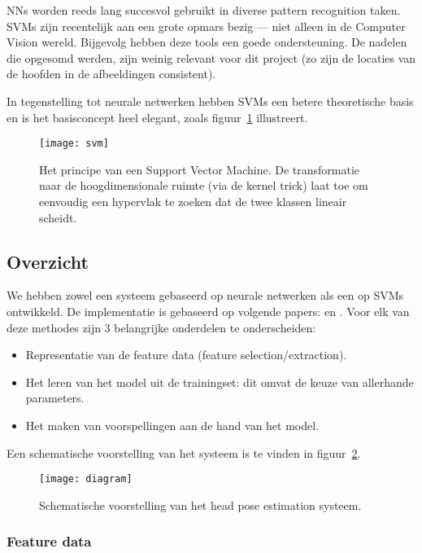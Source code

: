 \documentclass[a4paper,dutch,11pt,]{scrartcl}
\begin{document}
NNs worden reeds lang succesvol gebruikt in diverse pattern recognition taken. SVMs zijn recentelijk aan een grote opmars bezig --- niet alleen in de Computer Vision wereld. Bijgevolg hebben deze tools een goede ondersteuning. De nadelen die opgesomd werden, zijn weinig relevant voor dit project (zo zijn de locaties van de hoofden in de afbeeldingen consistent).

In tegenstelling tot neurale netwerken hebben SVMs een betere theoretische basis \cite{theoretical} en is het basisconcept heel elegant, zoals figuur~\ref{fig:svm} illustreert.

\begin{figure}[hbpt]\centering
 \texttt{[image: svm]}
\caption{Het principe van een Support Vector Machine. De transformatie naar de hoogdimensionale ruimte (via de kernel trick) laat toe om eenvoudig een hypervlak te zoeken dat de twee klassen lineair scheidt. \cite{svmwikipedia}}
\label{fig:svm}
\end{figure}

\subsection{Overzicht}
We hebben zowel een systeem gebaseerd op neurale netwerken als een op SVMs ontwikkeld. De implementatie is gebaseerd op volgende papers: \cite{neural} en \cite{svmli}.
Voor elk van deze methodes zijn 3 belangrijke onderdelen te onderscheiden: 
\begin{itemize}
 \item Representatie van de feature data (feature selection/extraction).
 \item Het leren van het model uit de trainingset: dit omvat de keuze van allerhande parameters.
 \item Het maken van voorspellingen aan de hand van het model.
\end{itemize}
Een schematische voorstelling van het systeem is te vinden in figuur~\ref{fig:diagram}.

\begin{figure}[hbpt]
\texttt{[image: diagram]}
\caption{Schematische voorstelling van het head pose estimation systeem.}
\label{fig:diagram}
\end{figure}

\subsubsection{Feature data}
\end{document}
